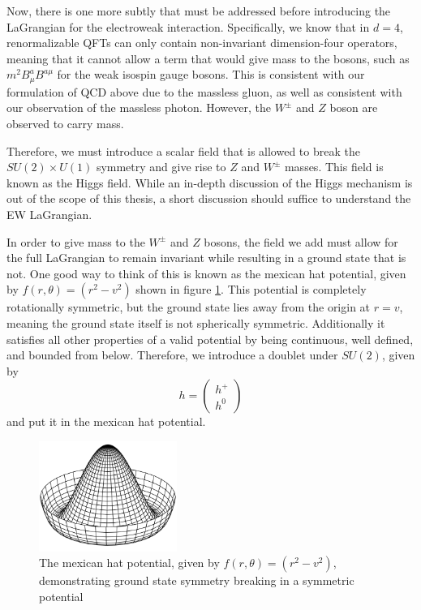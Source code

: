 Now, there is one more subtly that must be addressed before introducing the LaGrangian for the electroweak interaction. Specifically, we know that in $d=4$, renormalizable QFTs can only contain non-invariant dimension-four operators, meaning that it cannot allow a term that would give mass to the bosons, such as $m^2 B_{\mu}^aB^{a\mu}$ for the weak isospin gauge bosons.  This is consistent with our formulation of QCD above due to the massless gluon, as well as consistent with our observation of the massless photon. However, the $W^\pm$ and $Z$ boson are observed to carry mass.

Therefore, we must introduce a scalar field that is allowed to break the $SU(2) \times U(1)$ symmetry and give rise to $Z$ and $W^\pm$ masses. This field is known as the Higgs field. While an in-depth discussion of the Higgs mechanism is out of the scope of this thesis, a short discussion should suffice to understand the EW LaGrangian.

In order to give mass to the $W^\pm$ and $Z$ bosons, the field we add must allow for the full LaGrangian to remain invariant while resulting in a ground state that is not. One good way to think of this is known as the mexican hat potential, given by $f(r, \theta) = (r^2 - v^2)$ shown in figure \ref{fig:mexican_hat_potential}. This potential is completely rotationally symmetric, but the ground state lies away from the origin at $r = v$, meaning the ground state itself is not spherically symmetric. Additionally it satisfies all other properties of a valid potential by being continuous, well defined, and bounded from below. Therefore, we introduce a doublet under $SU(2)$, given by
\begin{equation}
h = \begin{pmatrix}
h^+ \\ h^0
\end{pmatrix}
\end{equation}
and put it in the mexican hat potential. 

\begin{figure}[ht!]
    \centering
    \includegraphics[width=0.4\textwidth]{figures/chapter2/mexican_hat_potential.png}
    \caption{The mexican hat potential, given by $f(r, \theta) = (r^2 - v^2)$, demonstrating ground state symmetry breaking in a symmetric potential}
    \label{fig:mexican_hat_potential}
\end{figure}

